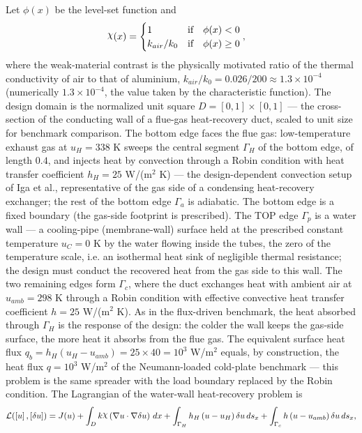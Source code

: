 \documentclass[preview]{standalone}
\let\oldcdot\cdot
\let\cdot\oldcdot
\begin{document}
Let $\phi(x)$ be the level-set function and
 \begin{align*}\raisebox{\depth}{$\chi$}(x) &= \begin{cases} 1 & \mbox{if}\quad \phi(x) < 0 \\ k_{air}/k_0 & \mbox{if}\quad \phi(x)  \ge 0 \end{cases},\end{align*}
where the weak-material contrast is the physically motivated ratio of the thermal conductivity of air to that of aluminium, $k_{air}/k_0 = 0.026/200 \approx 1.3 \times 10^{-4}$ (numerically $1.3 \times 10^{-4}$, the value taken by the characteristic function).
The design domain is the normalized unit square $D = [0,1] \times [0,1]$ — the cross-section of the conducting wall of a flue-gas heat-recovery duct, scaled to unit size for benchmark comparison.  The bottom edge faces the flue gas: low-temperature exhaust gas at $u_{H} = 338$ K sweeps the central segment $\Gamma_H$ of the bottom edge, of length $0.4$, and injects heat by convection through a Robin condition with heat transfer coefficient $h_{H} = 25$ W/(m$^{2}$ K) — the design-dependent convection setup of Iga et al., representative of the gas side of a condensing heat-recovery exchanger; the rest of the bottom edge $\Gamma_a$ is adiabatic.  The bottom edge is a fixed boundary (the gas-side footprint is prescribed).  The TOP edge $\Gamma_p$ is a water wall — a cooling-pipe (membrane-wall) surface held at the prescribed constant temperature $u_C = 0$ K by the water flowing inside the tubes, the zero of the temperature scale, i.e. an isothermal heat sink of negligible thermal resistance; the design must conduct the recovered heat from the gas side to this wall.  The two remaining edges form $\Gamma_c$, where the duct exchanges heat with ambient air at $u_{amb} = 298$ K through a Robin condition with effective convective heat transfer coefficient $h = 25$ W/(m$^{2}$ K).  As in the flux-driven benchmark, the heat absorbed through $\Gamma_H$ is the response of the design: the colder the wall keeps the gas-side surface, the more heat it absorbs from the flue gas.  The equivalent surface heat flux $q_b = h_{H} \left( u_{H} - u_{amb}\right) = 25 \times 40 = 10^{3}$ W/m$^{2}$ equals, by construction, the heat flux $q = 10^{3}$ W/m$^{2}$ of the Neumann-loaded cold-plate benchmark — this problem is the same spreader with the load boundary replaced by the Robin condition.
The Lagrangian of the water-wall heat-recovery problem is
\begin{dmath*}
\mathcal L(\left[ u\right],\left[ \delta u\right]) = J(u) +  \int_{D} k \raisebox{\depth}{$\chi$} \left(  \nabla u  \cdot  \nabla \delta u  \right) \,dx + \int_{\Gamma_H} h_H \left( u - u_{H}\right) \delta u \,ds_x + \int_{\Gamma_c} h \left( u - u_{amb}\right) \delta u \,ds_x ,
\end{dmath*}
\end{document}
